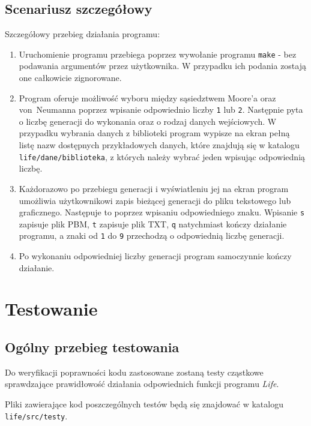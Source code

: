 \documentclass[a4paper,12pt,oneside]{article}
\begin{document}
\subsection{Scenariusz szczegółowy}
Szczegółowy przebieg działania programu:
\begin{enumerate}
\item Uruchomienie programu przebiega poprzez wywołanie programu \verb+make+ - bez podawania argumentów przez użytkownika. W przypadku ich podania zostają one całkowicie zignorowane.
\item Program oferuje możliwość wyboru między sąsiedztwem Moore'a oraz von~Neumanna poprzez wpisanie odpowiednio liczby \verb+1+ lub \verb+2+. Następnie pyta o liczbę generacji do wykonania oraz o rodzaj danych wejściowych. W przypadku wybrania danych z biblioteki program wypisze na ekran pełną listę nazw dostępnych przykładowych  danych, które znajdują się w katalogu \verb+life/dane/biblioteka+, z których należy wybrać jeden wpisując odpowiednią liczbę.
\item Każdorazowo po przebiegu generacji i wyświatleniu jej na ekran program umożliwia użytkownikowi zapis bieżącej generacji do pliku tekstowego lub graficznego. Następuje to poprzez wpisaniu odpowiedniego znaku. Wpisanie \verb+s+ zapisuje plik PBM, \verb+t+ zapisuje plik TXT, \verb+q+ natychmiast kończy działanie programu, a znaki od \verb+1+ do \verb+9+ przechodzą o odpowiednią liczbę generacji.
\item Po wykonaniu odpowiedniej liczby generacji program samoczynnie kończy działanie.
\end{enumerate}

\section{Testowanie}

\subsection{Ogólny przebieg testowania}

Do weryfikacji poprawności kodu zastosowane zostaną testy cząstkowe sprawdzające prawidłowość działania odpowiednich funkcji programu \textit{Life}.
\par Pliki zawierające kod poszczególnych testów będą się znajdować w katalogu \verb+life/src/testy+.
\end{document}
